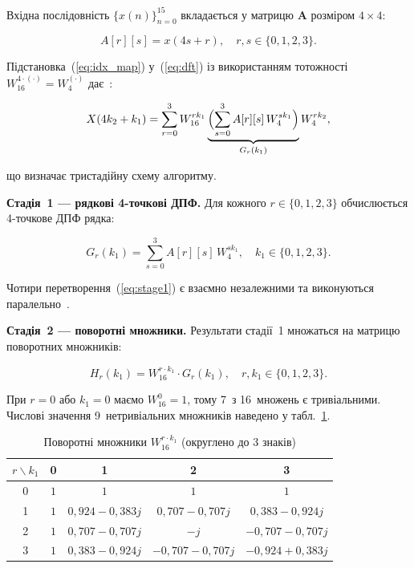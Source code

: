 Вхідна послідовність $\{x(n)\}_{n=0}^{15}$ вкладається у матрицю
$\mathbf{A}$ розміром $4 \times 4$:

\begin{equation}
  A[r][s] = x(4s + r), \quad r, s \in \{0,1,2,3\}.
  \label{eq:mat_A}
\end{equation}

Підстановка~(\ref{eq:idx_map}) у~(\ref{eq:dft}) із використанням
тотожності $W_{16}^{4 \cdot (\cdot)} = W_4^{(\cdot)}$
дає~\cite{burrus1985dft,nussbaumer1982}:

\begin{equation}
  X(4k_2 + k_1)
    = \sum_{r=0}^{3} W_{16}^{r k_1}
      \underbrace{\Bigl( \sum_{s=0}^{3} A[r][s]\, W_4^{s k_1} \Bigr)}_{G_r(k_1)}
      W_4^{r k_2},
  \label{eq:fft4x4}
\end{equation}

що визначає тристадійну схему алгоритму.

\textbf{Стадія~1 --- рядкові 4-точкові ДПФ.}
Для кожного $r \in \{0,1,2,3\}$ обчислюється 4-точкове ДПФ рядка:

\begin{equation}
  G_r(k_1) = \sum_{s=0}^{3} A[r][s]\, W_4^{s k_1},
  \quad k_1 \in \{0,1,2,3\}.
  \label{eq:stage1}
\end{equation}

Чотири перетворення~(\ref{eq:stage1}) є взаємно незалежними та
виконуються паралельно~\cite{nussbaumer1982}.

\textbf{Стадія~2 --- поворотні множники.}
Результати стадії~1 множаться на матрицю поворотних множників:

\begin{equation}
  H_r(k_1) = W_{16}^{r \cdot k_1} \cdot G_r(k_1),
  \quad r, k_1 \in \{0,1,2,3\}.
  \label{eq:stage2}
\end{equation}

При $r = 0$ або $k_1 = 0$ маємо $W_{16}^0 = 1$, тому 7~з 16~множень
є тривіальними. Числові значення 9~нетривіальних множників наведено
у табл.~\ref{tab:twiddle}.

\begin{table}[H]
  \caption{Поворотні множники $W_{16}^{r \cdot k_1}$ (округлено до 3 знаків)}
  \label{tab:twiddle}
  \centering
  \small
  \begin{tabular}{c|cccc}
    \toprule
    $r \backslash k_1$ & 0 & 1 & 2 & 3 \\
    \midrule
    0 & $1$ & $1$ & $1$ & $1$ \\
    1 & $1$ & $0{,}924{-}0{,}383j$ & $0{,}707{-}0{,}707j$ & $0{,}383{-}0{,}924j$ \\
    2 & $1$ & $0{,}707{-}0{,}707j$ & $-j$                  & $-0{,}707{-}0{,}707j$ \\
    3 & $1$ & $0{,}383{-}0{,}924j$ & $-0{,}707{-}0{,}707j$ & $-0{,}924{+}0{,}383j$ \\
    \bottomrule
  \end{tabular}
\end{table}

